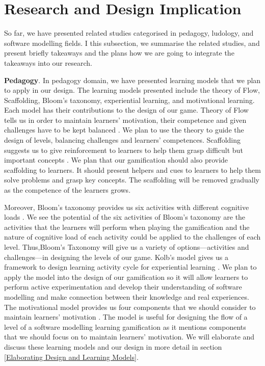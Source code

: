 \documentclass[12pt, a4paper]{report}
\begin{document}
{\section{Research and Design Implication}
\label{Research and Design Implication}
So far, we have presented related studies categorised in pedagogy, ludology, and software modelling fields. I this subsection, we summarise the related studies, and present briefly takeaways and the plans how we are going to integrate the takeaways into our research.     

\textbf{Pedagogy}. In pedagogy domain, we have presented learning models that we plan to apply in our design. The learning models presented include the theory of Flow, Scaffolding, Bloom's taxonomy, experiential learning, and motivational learning. Each model has their contributions to the design of our game. Theory of Flow tells us in order to maintain learners' motivation, their competence and given challenges have to be kept balanced \cite{csikszentmihalyi2014toward}. We plan to use the theory to guide the design of levels, balancing challenges and learners' competences. Scaffolding suggests us to give reinforcement to learners to help them grasp difficult but important concepts \cite{wood1976role, vygotsky1978mind}. We plan that our gamification should also provide scaffolding to learners. It should present helpers and cues to learners to help them solve problems and grasp key concepts. The scaffolding will be removed gradually as the competence of the learners grows. 

Moreover, Bloom's taxonomy provides us six activities with different cognitive loads \cite{krathwohl2002revision}. We see the potential of the six activities of Bloom’s taxonomy are the activities that the learners will perform when playing the gamification and the nature of cognitive load of each activity could be applied to the challenges of each level. Thus,Bloom's Taxonomy will give us a variety of options---activities and challenges---in designing the levels of our game. Kolb's model gives us a framework to design learning activity cycle for experiential learning \cite{kolb2014experiential}. We plan to apply the model into the design of our gamification so it will allow learners to perform active experimentation and develop their understanding of software modelling and make connection between their knowledge and real experiences. The motivational model provides us four components that we should consider to maintain learners' motivation \cite{keller2010motivational}. The model is useful for designing the flow of a level of a software modelling learning gamification as it mentions components that we should focus on to maintain learners' motivation. We will elaborate and discuss these learning models and our design in more detail in section \ref{Elaborating Design and Learning Models}. 

}
\end{document}
